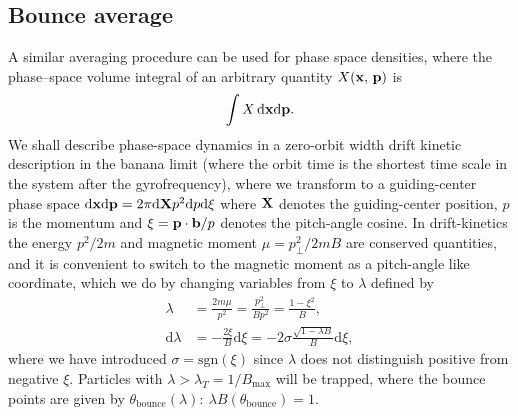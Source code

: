 \documentclass[11pt,a4paper]{article}
\newcommand{\rd}{\ensuremath{\mathrm{d}}}
\newcommand{\sub}[1]{\ensuremath{_{\text{#1}}}}
\renewcommand{\b}[1]{\ensuremath{ {\bf #1 } }}
\begin{document}
\subsection{Bounce average}
A similar averaging procedure can be used for phase space densities, where the phase--space volume integral of an arbitrary quantity $X(\b{x},\,\b{p})$ is
\begin{align}
\int X \,\rd\b{x} \rd\b{p}.
\end{align}
We shall describe phase-space dynamics in a zero-orbit width drift kinetic description in the banana limit (where the orbit time is the shortest time scale in the system after the gyrofrequency), where we transform to a guiding-center phase space $\rd\b{x} \rd\b{p} = 2\pi \rd \b{X} p^2 \rd p \rd \xi$ where $\b{X}$ denotes the guiding-center position, $p$ is the momentum and $\xi = \b{p}\cdot\b{b}/p$ denotes the pitch-angle cosine. In drift-kinetics the energy $p^2/2m$ and magnetic moment $\mu = p_\perp^2/2mB$ are conserved quantities, and it is convenient to switch to the magnetic moment as a pitch-angle like coordinate, which we do by changing variables from $\xi$ to $\lambda$ defined by
\begin{align}
\lambda &= \frac{2m \mu}{p^2} = \frac{p_\perp^2}{B p^2} = \frac{1-\xi^2}{B}, \nonumber \\
\rd \lambda &= -\frac{2\xi}{B}\rd \xi = -2\sigma\frac{\sqrt{1-\lambda B}}{B} \rd \xi,
\end{align}
where we have introduced $\sigma = \text{sgn}(\xi)$ since $\lambda$ does not distinguish positive from negative $\xi$. Particles with $\lambda > \lambda_T = 1/B\sub{max}$ will be trapped, where the bounce points are given by $\theta\sub{bounce}(\lambda):~\lambda B(\theta\sub{bounce}) = 1$.
\end{document}

